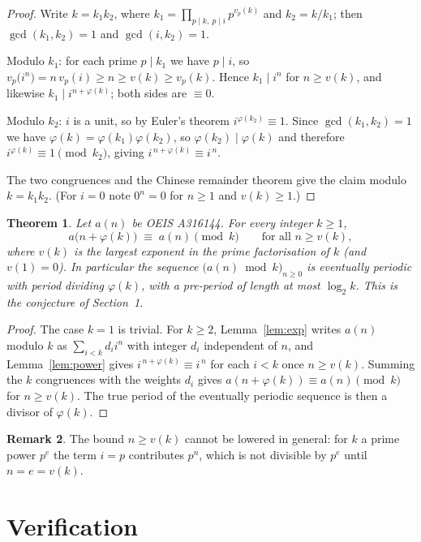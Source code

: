 \documentclass[11pt,a4paper]{article}
\theoremstyle{plain}
\newtheorem{theorem}{Theorem}
\theoremstyle{definition}
\newtheorem{remark}[theorem]{Remark}
\begin{document}
\begin{proof}
Write $k=k_1k_2$, where $k_1=\prod_{p\mid k,\ p\mid i}p^{v_p(k)}$ and $k_2=k/k_1$; then
$\gcd(k_1,k_2)=1$ and $\gcd(i,k_2)=1$.

Modulo $k_1$: for each prime $p\mid k_1$ we have $p\mid i$, so
$v_p\bigl(i^{n}\bigr)=n\,v_p(i)\ge n\ge v(k)\ge v_p(k)$. Hence $k_1\mid i^{n}$ for
$n\ge v(k)$, and likewise $k_1\mid i^{n+\varphi(k)}$; both sides are $\equiv 0$.

Modulo $k_2$: $i$ is a unit, so by Euler's theorem $i^{\varphi(k_2)}\equiv 1$. Since
$\gcd(k_1,k_2)=1$ we have $\varphi(k)=\varphi(k_1)\varphi(k_2)$, so
$\varphi(k_2)\mid\varphi(k)$ and therefore $i^{\varphi(k)}\equiv 1 \pmod{k_2}$, giving
$i^{\,n+\varphi(k)}\equiv i^{\,n}$.

The two congruences and the Chinese remainder theorem give the claim modulo $k=k_1k_2$.
(For $i=0$ note $0^{n}=0$ for $n\ge 1$ and $v(k)\ge1$.)
\end{proof}

\begin{theorem}\label{thm:main}
Let $a(n)$ be OEIS A316144. For every integer $k\ge1$,
\[
a\bigl(n+\varphi(k)\bigr)\;\equiv\;a(n)\pmod{k}\qquad\text{for all } n\ge v(k),
\]
where $v(k)$ is the largest exponent in the prime factorisation of $k$ (and $v(1)=0$).
In particular the sequence $\bigl(a(n)\bmod k\bigr)_{n\ge0}$ is eventually periodic with
period dividing $\varphi(k)$, with a pre-period of length at most $\log_2 k$. This is the
conjecture of Section~1.
\end{theorem}

\begin{proof}
The case $k=1$ is trivial. For $k\ge2$, Lemma~\ref{lem:exp} writes $a(n)$ modulo $k$ as
$\sum_{i<k}d_i i^{n}$ with integer $d_i$ independent of $n$, and Lemma~\ref{lem:power}
gives $i^{\,n+\varphi(k)}\equiv i^{\,n}$ for each $i<k$ once $n\ge v(k)$. Summing the
$k$ congruences with the weights $d_i$ gives
$a(n+\varphi(k))\equiv a(n)\pmod k$ for $n\ge v(k)$. The true period of the eventually
periodic sequence is then a divisor of $\varphi(k)$.
\end{proof}

\begin{remark}
The bound $n\ge v(k)$ cannot be lowered in general: for $k$ a prime power $p^{e}$ the
term $i=p$ contributes $p^{n}$, which is not divisible by $p^{e}$ until $n=e=v(k)$.
\end{remark}

\section{Verification}
\end{document}
